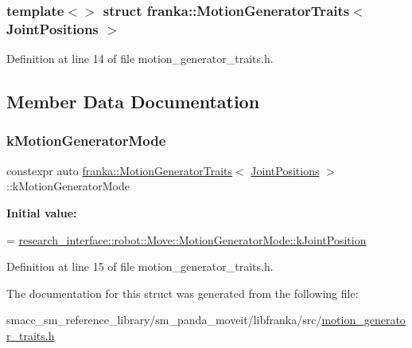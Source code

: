 \subsubsection*{template$<$$>$\newline
struct franka\+::\+Motion\+Generator\+Traits$<$ Joint\+Positions $>$}



Definition at line 14 of file motion\+\_\+generator\+\_\+traits.\+h.



\subsection{Member Data Documentation}
\mbox{\label{structfranka_1_1MotionGeneratorTraits_3_01JointPositions_01_4_a4c38fe31d9a4d30c039f5068ddf42af1}} 
\subsubsection{\texorpdfstring{k\+Motion\+Generator\+Mode}{kMotionGeneratorMode}}
{\footnotesize\ttfamily constexpr auto \hyperlink{structfranka_1_1MotionGeneratorTraits}{franka\+::\+Motion\+Generator\+Traits}$<$ \hyperlink{classfranka_1_1JointPositions}{Joint\+Positions} $>$\+::k\+Motion\+Generator\+Mode\hspace{0.3cm}{\ttfamily [static]}}

{\bfseries Initial value\+:}
\begin{DoxyCode}
=
      \hyperlink{structresearch__interface_1_1robot_1_1Move_a334b8380507154e8042b57fbd3287c0fa3a31dc92434874cc44c61e876b8bd35f}{research\_interface::robot::Move::MotionGeneratorMode::kJointPosition}
\end{DoxyCode}


Definition at line 15 of file motion\+\_\+generator\+\_\+traits.\+h.



The documentation for this struct was generated from the following file\+:\begin{DoxyCompactItemize}
\item 
smacc\+\_\+sm\+\_\+reference\+\_\+library/sm\+\_\+panda\+\_\+moveit/libfranka/src/\hyperlink{motion__generator__traits_8h}{motion\+\_\+generator\+\_\+traits.\+h}\end{DoxyCompactItemize}
